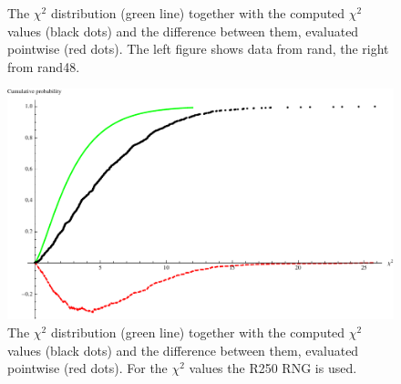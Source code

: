 \documentclass[10pt,a4paper]{article}
\begin{document}
\begin{figure}[H]
  \centering
  \caption{The $\chi^2$ distribution (green line) together with the computed $\chi^2$ values (black dots) and the difference between them, evaluated pointwise (red dots). The left figure shows data from rand, the right from rand48.}
  \label{fig:compare}
\end{figure}

\begin{figure}[H]
  \centering
  \includegraphics[scale=0.5]{r250_test.pdf}
  \caption{The $\chi^2$ distribution (green line) together with the computed $\chi^2$ values (black dots) and the difference between them, evaluated pointwise (red dots). For the $\chi^2$ values the R250 RNG is used.}
  \label{fig:r250}
\end{figure}
\end{document}
